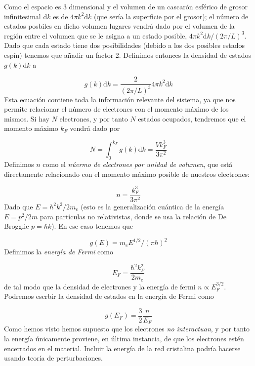 \documentclass[12pt,a4paper]{book}
\numberwithin{equation}{section}
\numberwithin{figure}{section}
\newcommand{\D}{\mathrm{d}}
\begin{document}
Como el espacio es 3 dimensional y el volumen de un cascarón esférico de grosor infinitesimal $\D k$ es de $4 \pi k^2 \D k$ (que sería la superficie por el grosor); el número de estados posbiles en dicho volumen lugares vendrá dado por el volumen de la región entre el volumen que se le asigna a un estado posible, $4 \pi k^2 \D k / (2 \pi/L)^3$. Dado que cada estado tiene dos posibilidades (debido a los dos posibles estados espín) tenemos que añadir un factor 2. Definimos entonces la densidad de estados $g(k)\D k$ a

\begin{equation}
    g(k) \D k = \frac{2}{(2\pi/L)^3} 4 \pi k^2 \D k
\end{equation}
Esta ecuación contiene toda la información relevante del sistema, ya que nos permite relacionar el número de electrones con el momento máximo de los mismos. Si hay $N$ electrones, y por tanto $N$ estados ocupados, tendremos que el momento máximo $k_F$ vendrá dado por

\begin{equation}
    N = \int_0^{k_F} g(k) \D k = \frac{V k_F^3}{3 \pi^2}
\end{equation}
Definimos $n$ como el \textit{núermo de electrones por unidad de volumen}, que está directamente relacionado con el momento máximo posible de nuestros electrones:

\begin{equation}
    n = \frac{k_F^3}{3 \pi^2}
\end{equation}
Dado que $E=\hbar^2 k^2/2m_e$ (esto es la generalización cuántica de la energía $E=p^2/2m$ para partículas no relativistas, donde se usa la relación de De Brogglie $p=\hbar k$). En ese caso tenemos que 

\begin{equation}
    g(E)=m_e E^{1/2}/(\pi \hbar)^2
\end{equation}
Definimos la \textit{energía de Fermi} como

\begin{equation}
    E_F = \frac{\hbar^2 k_{F}^2}{2 m_e}
\end{equation}
de tal modo que la densidad de electrones y la energía de fermi $n\varpropto E_F^{3/2}$. Podremos escrbir la densidad de estados en la energía de Fermi como

\begin{equation}
    g(E_F) = \frac{3}{2} \frac{n}{E_F}
\end{equation}
Como hemos visto hemos supuesto que los electrones \textit{no interactuan}, y por tanto la energía únicamente proviene, en última instancia, de que los electrones estén encerrados en el material. Incluir la energía de la red cristalina podría hacerse usando teoría de perturbaciones. \\
\end{document}
